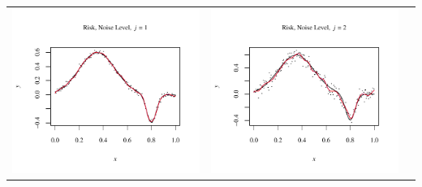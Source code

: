 \documentclass[11pt]{article}
\begin{document}
\begin{table}[h!]
  \begin{center}
    \renewcommand{\arraystretch}{1.5}
    \begin{tabular}{| >{\centering\arraybackslash}m{2.1in} |  >{\centering\arraybackslash}m{2.1in} |  >{\centering\arraybackslash}m{2.1in}|}
      \hline
      \includegraphics[width=1\linewidth,height=0.18\textheight]{Graphs/4/1/assignment5_a_4_1_1}&
      \includegraphics[width=1\linewidth,height=0.18\textheight]{Graphs/4/1/assignment5_a_4_1_2}&

\end{tabular}
\end{center}
\end{table}
\end{document}
